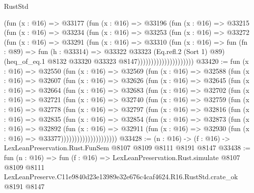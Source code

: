 \begin{lexlean}{RustStd}
\begin{coremodule}
                          (fun (x : @16) =>
                          @33177
                            (fun (x : @16) =>
                            @33196
                              (fun (x : @16) =>
                              @33215
                                (fun (x : @16) =>
                                @33234
                                  (fun (x : @16) =>
                                  @33253
                                    (fun (x : @16) =>
                                    @33272
                                      (fun (x : @16) =>
                                      @33291
                                        (fun (x : @16) =>
                                        @33310
                                          (fun (x : @16) =>
                                          fun (fn : @89) =>
                                          fun (h : @33314) =>
                                          @33322
                                            @33323
                                            (Eq.refl.{2} (Sort 1) @89)
                                            (heq_of_eq.{1}
                                              @8132
                                              @33320
                                              @33323
                                              @8147)))))))))))))))))))))
@33420 := fun (x : @16) =>
  @32550
    (fun (x : @16) =>
    @32569
      (fun (x : @16) =>
      @32588
        (fun (x : @16) =>
        @32607
          (fun (x : @16) =>
          @32626
            (fun (x : @16) =>
            @32645
              (fun (x : @16) =>
              @32664
                (fun (x : @16) =>
                @32683
                  (fun (x : @16) =>
                  @32702
                    (fun (x : @16) =>
                    @32721
                      (fun (x : @16) =>
                      @32740
                        (fun (x : @16) =>
                        @32759
                          (fun (x : @16) =>
                          @32778
                            (fun (x : @16) =>
                            @32797
                              (fun (x : @16) =>
                              @32816
                                (fun (x : @16) =>
                                @32835
                                  (fun (x : @16) =>
                                  @32854
                                    (fun (x : @16) =>
                                    @32873
                                      (fun (x : @16) =>
                                      @32892
                                        (fun (x : @16) =>
                                        @32911
                                          (fun (x : @16) =>
                                          @32930 (fun (x : @16) => @33377)))))))))))))))))))))
@33428 := (n : @16) -> (f : @16) -> LexLeanPreservation.Rust.FunSem @8107 @8109 @8111 @8191 @8147
@33438 := fun (n : @16) =>
  fun (f : @16) =>
  LexLeanPreservation.Rust.simulate
    @8107
    @8109
    @8111
    LexLeanPreserve.C11e9840d23e13989e32e676c4caf4624.R16.RustStd.crate_ok
    @8191
    @8147
\end{coremodule}
\end{lexlean}
